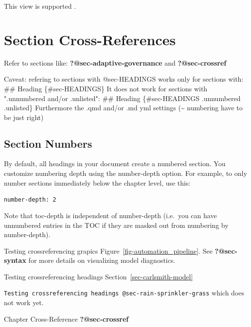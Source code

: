 \documentclass[
  11pt,
  letterpaper,
]{book}
\newenvironment{Shaded}{\begin{snugshade}}{\end{snugshade}}
\newcommand{\AnnotationTok}[1]{\textcolor[rgb]{0.37,0.37,0.37}{#1}}
\newcommand{\CommentTok}[1]{\textcolor[rgb]{0.37,0.37,0.37}{#1}}
\newcommand{\FunctionTok}[1]{\textcolor[rgb]{0.28,0.35,0.67}{#1}}
\newcommand{\NormalTok}[1]{\textcolor[rgb]{0.00,0.23,0.31}{#1}}
\begin{document}
This view is supported \autocites[23]{soares2014}[156-159]{knuth1984}.

\section*{Section Cross-References}\label{sec-crossref}


Refer to sections like: \textbf{?@sec-adaptive-governance} and
\textbf{?@sec-crossref}

\begin{Shaded}
\begin{Highlighting}[]
\AnnotationTok{Caveat:}\CommentTok{ refering to sections with @sec{-}HEADINGS works only for sections with:}
\FunctionTok{\#\# Heading \{\#sec{-}HEADINGS\}}
\NormalTok{It does not work for sections with ".unnumbered and/or .unlisted":}
\FunctionTok{\#\# Heading \{\#sec{-}HEADINGS .unnumbered .unlisted\}}
\NormalTok{Furthermore the .qmd and/or .md yml settings (\textasciitilde{} numbering have to be just right)}
\end{Highlighting}
\end{Shaded}

\subsection*{Section Numbers}\label{section-numbers}

By default, all headings in your document create a numbered section. You
customize numbering depth using the number-depth option. For example, to
only number sections immediately below the chapter level, use this:

\texttt{number-depth:\ 2}

Note that toc-depth is independent of number-depth (i.e.~you can have
unnumbered entries in the TOC if they are masked out from numbering by
number-depth).

Testing crossreferencing grapics Figure~\ref{fig-automation_pipeline}.
See \textbf{?@sec-syntax} for more details on visualizing model
diagnostics.

Testing crossreferencing headings Section~\ref{sec-carlsmith-model}

\texttt{Testing\ crossreferencing\ headings\ @sec-rain-sprinkler-grass}
which does not work yet.

Chapter Cross-Reference \textbf{?@sec-crossref}
\end{document}
